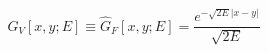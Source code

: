 \begin{equation}
\label{free1}
\hat{G}_V[x, y; E] \equiv \hat{G}_F[x, y; E] = 
\frac{e^{-\sqrt{2E} |x - y|}}{\sqrt{2E}}
\end{equation}

